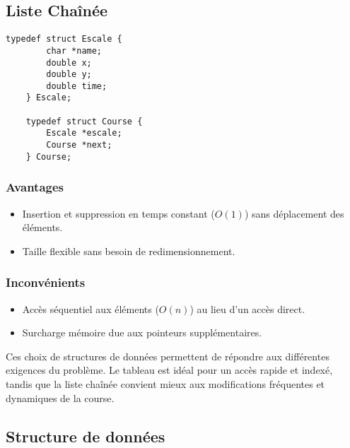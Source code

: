 \subsection{Liste Chaînée}
\begin{lstlisting}[caption={Structure de données (liste chainée)}]
    typedef struct Escale {
        char *name;
        double x;
        double y;
        double time;
    } Escale;

    typedef struct Course {
        Escale *escale;
        Course *next;
    } Course;
\end{lstlisting}

\subsubsection{Avantages}
\begin{itemize}
    \item Insertion et suppression en temps constant ($O(1)$) sans déplacement des éléments.
    \item Taille flexible sans besoin de redimensionnement.
\end{itemize}

\subsubsection{Inconvénients}
\begin{itemize}
    \item Accès séquentiel aux éléments ($O(n)$) au lieu d'un accès direct.
    \item Surcharge mémoire due aux pointeurs supplémentaires.
\end{itemize}

Ces choix de structures de données permettent de répondre aux différentes exigences du problème. Le tableau est idéal pour un accès rapide et indexé, tandis que la liste chaînée convient mieux aux modifications fréquentes et dynamiques de la course.

\subsection{Structure de données}

